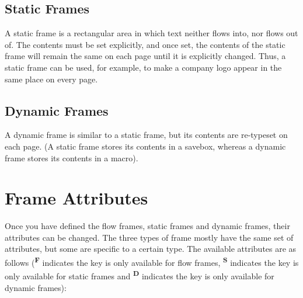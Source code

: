 \documentclass[a4paper,twoside]{book}
\begin{document}
\section{Static Frames}

A static frame is a rectangular area in which text neither
flows into, nor flows out of.  The contents must be set
explicitly, and once set, the contents of the static frame will
remain the same on each page until it is explicitly 
changed.  Thus, a static frame can be used, for example, to make 
a company logo appear in the same place on every page.

\section{Dynamic Frames}

A dynamic frame is similar to a static frame, but its contents
are re-typeset on each page. (A static frame stores its 
contents in a savebox, whereas a dynamic frame stores its
contents in a macro).

\chapter{Frame Attributes}
\label{sec:modattr}

Once you have defined the {flow frames}, {static frames} and 
{dynamic frames}, their attributes can be changed. 
The three types of frame mostly have the 
same set of attributes, but some are specific to a certain type.
The available attributes are as follows
(\textsuperscript{\textbf{F}} indicates the key is
only available for {flow frames}, 
\textsuperscript{\textbf{S}} indicates the key is only available 
for {static frames}
and \textsuperscript{\textbf{D}} indicates the key
is only available for {dynamic frames}):
\end{document}
